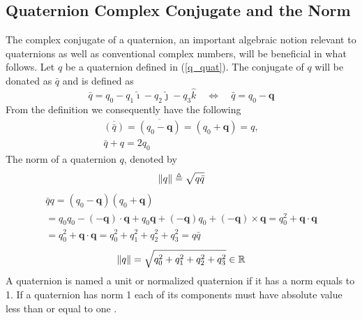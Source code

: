 \subsection{Quaternion Complex Conjugate and the Norm}
The complex conjugate of a quaternion, an important algebraic notion relevant to quaternions as well as conventional complex numbers, will be beneficial in what follows.
Let $q$ be a quaternion defined in (\ref{q_quat}). The conjugate of $q$ will be donated as $\bar{q}$ and is defined as
\begin{equation}\label{q_quat_con}
    \bar{q}=q_{0}-q_{1} \hat{\imath}-q_{2} \hat{\jmath}-q_{3} \hat{k} \quad \Leftrightarrow \quad \bar{q}=q_{0}-\boldsymbol{q}
\end{equation}
From the definition we consequently have the following
\begin{equation*}
\begin{gathered}
\overline{(\bar{q})}=\overline{\left(q_{0}-\boldsymbol{q}\right)}=\left(q_{0}+\boldsymbol{q}\right)=q,\\
    \bar{q}+q=2 q_{0}
\end{gathered}
\end{equation*}
The norm of a quaternion $q$, denoted by 
\begin{equation}
\norm{q}\triangleq\sqrt{q \bar{q}}
\end{equation}
\begin{equation}
\begin{gathered}
\bar{q} q=\left(q_{0}-\boldsymbol{q}\right)\left(q_{0}+\boldsymbol{q}\right) \\
=q_{0} q_{0}-(-\boldsymbol{q}) \cdot \boldsymbol{q}+q_{0} \boldsymbol{q}+(-\boldsymbol{q}) q_{0}+(-\boldsymbol{q}) \times \boldsymbol{q}=q_{0}^{2}+\boldsymbol{q} \cdot \boldsymbol{q} \\
=q_{0}^{2}+\boldsymbol{q} \cdot \boldsymbol{q}=q_{0}^{2}+q_{1}^{2}+q_{2}^{2}+q_{3}^{2}=q \bar{q}
\end{gathered}
\end{equation}
\begin{equation}
    \norm{q}=\sqrt{q_{0}^{2}+q_{1}^{2}+q_{2}^{2}+q_{3}^{2}} \in \mathbb{R}
\end{equation}
A quaternion is named a unit or normalized quaternion if it has a norm equals to 1. If a quaternion has norm 1 each of its components must have absolute value less than or equal to one \cite{kuipers1999quaternions}.

